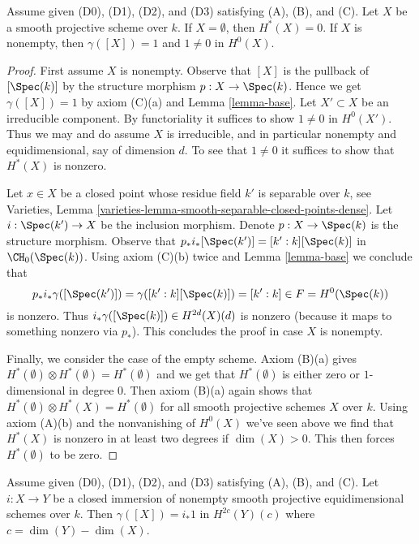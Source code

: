 \begin{lemma}
\label{lemma-unit}
Assume given (D0), (D1), (D2), and (D3) satisfying (A), (B), and (C).
Let $X$ be a smooth projective scheme over $k$.
If $X = \emptyset$, then $H^*(X) = 0$.
If $X$ is nonempty, then $\gamma([X]) = 1$ and $1 \not = 0$ in $H^0(X)$.
\end{lemma}

\begin{proof}
First assume $X$ is nonempty.
Observe that $[X]$ is the pullback of $[\Spec(k)]$ by the structure morphism
$p : X \to \Spec(k)$. Hence we get $\gamma([X]) = 1$ by axiom (C)(a)
and Lemma \ref{lemma-base}. Let $X' \subset X$ be an irreducible component.
By functoriality it suffices to show $1 \not = 0$ in $H^0(X')$.
Thus we may and do assume $X$ is irreducible, and in particular
nonempty and equidimensional, say of dimension $d$.
To see that $1 \not = 0$ it suffices to show that $H^*(X)$ is nonzero.

\medskip\noindent
Let $x \in X$ be a closed point whose residue field $k'$
is separable over $k$, see
Varieties, Lemma \ref{varieties-lemma-smooth-separable-closed-points-dense}.
Let $i : \Spec(k') \to X$ be the inclusion morphism.
Denote  $p : X \to \Spec(k)$ is the structure morphism.
Observe that
$p_*i_*[\Spec(k')] = [k' : k][\Spec(k)]$ in $\CH_0(\Spec(k))$.
Using axiom (C)(b) twice and Lemma \ref{lemma-base}
we conclude that
$$
p_*i_*\gamma([\Spec(k')]) = \gamma([k' : k][\Spec(k)]) = [k' : k]
\in F = H^0(\Spec(k))
$$
is nonzero. Thus $i_*\gamma([\Spec(k)]) \in H^{2d}(X)(d)$ is nonzero
(because it maps to something nonzero via $p_*$). This concludes the proof
in case $X$ is nonempty.

\medskip\noindent
Finally, we consider the case of the empty scheme. Axiom (B)(a) gives
$H^*(\emptyset) \otimes H^*(\emptyset) = H^*(\emptyset)$ and
we get that $H^*(\emptyset)$ is either zero or $1$-dimensional
in degree $0$. Then axiom (B)(a) again shows that
$H^*(\emptyset) \otimes H^*(X) = H^*(\emptyset)$ for
all smooth projective schemes $X$ over $k$. Using axiom (A)(b)
and the nonvanishing of $H^0(X)$ we've seen above
we find that $H^*(X)$ is nonzero in at least two degrees
if $\dim(X) > 0$. This then forces $H^*(\emptyset)$ to be zero.
\end{proof}

\begin{lemma}
\label{lemma-push-unit}
Assume given (D0), (D1), (D2), and (D3) satisfying (A), (B), and (C).
Let $i : X \to Y$ be a closed immersion of nonempty smooth projective
equidimensional schemes over $k$. Then
$\gamma([X]) = i_*1$ in $H^{2c}(Y)(c)$ where $c = \dim(Y) - \dim(X)$.
\end{lemma}

